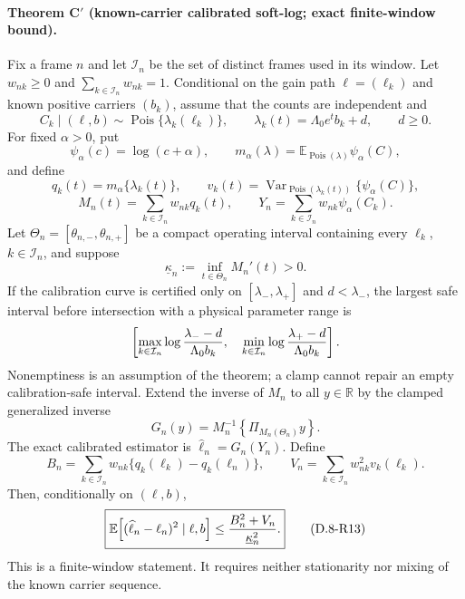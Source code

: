 
\paragraph{Theorem C$'$ (known-carrier calibrated soft-log; exact finite-window bound).}
Fix a frame $n$ and let $\mathcal I_n$ be the set of distinct frames
used in its window.  Let $w_{nk}\ge0$ and
$\sum_{k\in\mathcal I_n}w_{nk}=1$.  Conditional on the gain path
$\ell=(\ell_k)$ and known positive carriers $(b_k)$, assume that the
counts are independent and
\[
 C_k\mid(\ell,b)\sim\operatorname{Pois}\{\lambda_k(\ell_k)\},
 \qquad
 \lambda_k(t)=\Lambda_0e^t b_k+d,
 \qquad d\ge0.
\]
For fixed $\alpha>0$, put
\[
 \psi_\alpha(c)=\log(c+\alpha),\qquad
 m_\alpha(\lambda)
 =\mathbb E_{\operatorname{Pois}(\lambda)}\psi_\alpha(C),
\]
and define
\[
 q_k(t)=m_\alpha\{\lambda_k(t)\},\qquad
 v_k(t)=\operatorname{Var}_{\operatorname{Pois}(\lambda_k(t))}
             \{\psi_\alpha(C)\},
\]
\[
 M_n(t)=\sum_{k\in\mathcal I_n}w_{nk}q_k(t),\qquad
 Y_n=\sum_{k\in\mathcal I_n}w_{nk}\psi_\alpha(C_k).
\]
Let $\Theta_n=[\theta_{n,-},\theta_{n,+}]$ be a compact operating
interval containing every $\ell_k$, $k\in\mathcal I_n$, and suppose
\[
 \underline\kappa_n:=\inf_{t\in\Theta_n}M_n'(t)>0.
\]
If the calibration curve is certified only on
$[\lambda_-,\lambda_+]$ and $d<\lambda_-$, the largest safe interval
before intersection with a physical parameter range is
\[
 \left[
 \max_{k\in\mathcal I_n}
  \log{\lambda_--d\over\Lambda_0b_k},
 \quad
 \min_{k\in\mathcal I_n}
  \log{\lambda_+-d\over\Lambda_0b_k}
 \right].
\]
Nonemptiness is an assumption of the theorem; a clamp cannot repair an
empty calibration-safe interval.
Extend the inverse of $M_n$ to all $y\in\mathbb R$ by the clamped
generalized inverse
\[
 G_n(y)=M_n^{-1}\!\left\{\Pi_{M_n(\Theta_n)}y\right\}.
\]
The exact calibrated estimator is $\widehat\ell_n=G_n(Y_n)$.  Define
\[
 B_n=\sum_{k\in\mathcal I_n}w_{nk}
       \{q_k(\ell_k)-q_k(\ell_n)\},
 \qquad
 V_n=\sum_{k\in\mathcal I_n}w_{nk}^2v_k(\ell_k).
\]
Then, conditionally on $(\ell,b)$,
\begin{equation}
 \boxed{
 \mathbb E\!\left[(\widehat\ell_n-\ell_n)^2\mid\ell,b\right]
 \le {B_n^2+V_n\over\underline\kappa_n^2}.}
 \tag{D.8-R13}
\end{equation}
This is a finite-window statement.  It requires neither stationarity
nor mixing of the known carrier sequence.

